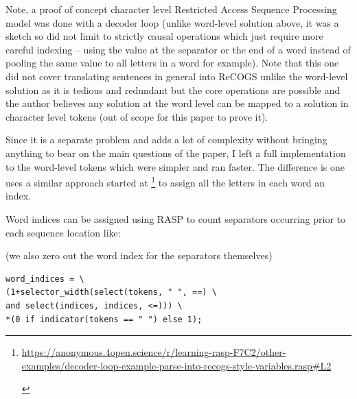 \documentclass[11pt]{article}
\begin{document}
Note, a proof of concept character level Restricted Access Sequence Processing model was done with a decoder loop (unlike word-level solution above, it was a sketch so did not limit to strictly causal operations which just require more careful indexing -- using the value at the separator or the end of a word instead of pooling the same value to all letters in a word for example). Note that this one did not cover translating sentences in general into ReCOGS unlike the word-level solution as it is tedious and redundant but the core operations are possible and the author believes any solution at the word level can be mapped to a solution in character level tokens (out of scope for this paper to prove it).

Since it is a separate problem and adds a lot of complexity without bringing anything to bear on the main questions of the paper, I left a full implementation to the word-level tokens which were simpler and ran faster. The difference is one uses a similar approach started at \footnote{\begin{footnotesize}\href{https://anonymous.4open.science/r/learning-rasp-F7C2/other-examples/decoder-loop-example-parse-into-recogs-style-variables.rasp\#L2}{https://anonymous.4open.science/r/learning-rasp-F7C2/other-examples/decoder-loop-example-parse-into-recogs-style-variables.rasp\#L2}\end{footnotesize}} to assign all the letters in each word an index. 

Word indices can be assigned using RASP to count separators occurring prior to each sequence location like:

(we also zero out the word index for the separators themselves)

\begin{tiny}
\begin{verbatim}
word_indices = \
(1+selector_width(select(tokens, " ", ==) \
and select(indices, indices, <=))) \
*(0 if indicator(tokens == " ") else 1);
\end{verbatim}
\end{tiny}
\end{document}

